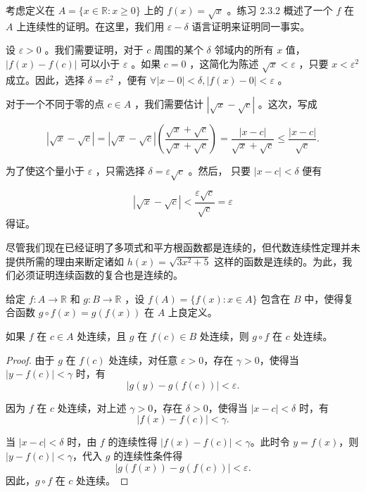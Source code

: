 \begin{Eg}
  \label{eg:4.3.8}
考虑定义在 \(A = \{ x \in  \mathbb{R} : x \geq  0\}\) 上的 \(f\left( x\right)  = \sqrt{x}\) 。练习 2.3.2 概述了一个 \(f\) 在 \(A\) 上连续性的证明。在这里，我们用 \(\varepsilon  - \delta\) 语言证明来证明同一事实。

设 \(\varepsilon  > 0\) 。我们需要证明，对于 \(c\) 周围的某个 \(\delta\) 邻域内的所有 \(x\) 值， \(\left| {f\left( x\right)  - f\left( c\right) }\right|\) 可以小于 \(\varepsilon\) 。如果 \(c = 0\) ，这简化为陈述 \(\sqrt{x} < \varepsilon\) ，只要 \(x < {\varepsilon }^{2}\) 成立。因此，选择 \(\delta  = {\varepsilon }^{2}\) ，便有 \(\forall \left| {x - 0}\right|  < \delta, \left| {f\left( x\right)  - 0}\right|  < \varepsilon\) 。

对于一个不同于零的点 \(c \in  A\) ，我们需要估计 \(\left| {\sqrt{x} - \sqrt{c}}\right|\) 。这次，写成

\[
\left| {\sqrt{x} - \sqrt{c}}\right|  = \left| {\sqrt{x} - \sqrt{c}}\right| \left( \frac{\sqrt{x} + \sqrt{c}}{\sqrt{x} + \sqrt{c}}\right)  = \frac{\left| x - c\right| }{\sqrt{x} + \sqrt{c}} \leq  \frac{\left| x - c\right| }{\sqrt{c}}.
\]

为了使这个量小于 \(\varepsilon\) ，只需选择 \(\delta  = \varepsilon \sqrt{c}\) 。然后， 只要 \(\left| {x - c}\right|  < \delta\) 便有

\[
\left| {\sqrt{x} - \sqrt{c}}\right|  < \frac{\varepsilon \sqrt{c}}{\sqrt{c}} = \varepsilon
\]
 得证。
\end{Eg}


尽管我们现在已经证明了多项式和平方根函数都是连续的，但代数连续性定理并未提供所需的理由来断定诸如 \(h\left( x\right)  = \sqrt{3{x}^{2} + 5}\) 这样的函数是连续的。为此，我们必须证明连续函数的复合也是连续的。

\begin{Thm}[连续函数的复合]
  给定 \(f : A \rightarrow \mathbb{R}\) 和 \(g : B \rightarrow  \mathbb{R}\) ，设 \(f\left( A\right)  = \{ f\left( x\right)  : x \in  A\}\) 包含在 \(B\) 中，使得复合函数 \(g \circ  f\left( x\right)  = g\left( {f\left( x\right) }\right)\) 在 \(A\) 上良定义。

如果 \(f\) 在 \(c \in  A\) 处连续，且 \(g\) 在 \(f\left( c\right)  \in  B\) 处连续，则 \(g \circ  f\) 在 \(c\) 处连续。
\end{Thm}



\begin{proof}
  
   由于 \( g \) 在 \( f(c) \) 处连续，对任意 \( \varepsilon > 0 \)，存在 \( \gamma > 0 \)，使得当 \( |y - f(c)| < \gamma \) 时，有  
   \[
   |g(y) - g(f(c))| < \varepsilon.
   \]

   因为 \( f \) 在 \( c \) 处连续，对上述 \( \gamma > 0 \)，存在 \( \delta > 0 \)，使得当 \( |x - c| < \delta \) 时，有  
   \[
   |f(x) - f(c)| < \gamma.
   \]

   当 \( |x - c| < \delta \) 时，由 \( f \) 的连续性得 \( |f(x) - f(c)| < \gamma \)。此时令 \( y = f(x) \)，则 \( |y - f(c)| < \gamma \)，代入 \( g \) 的连续性条件得  
   \[
   |g(f(x)) - g(f(c))| < \varepsilon.
   \]  
   因此，\( g \circ f \) 在 \( c \) 处连续。
\end{proof}


